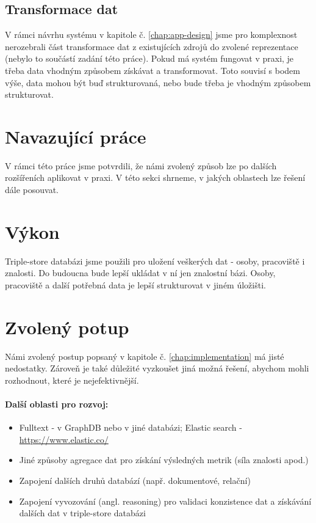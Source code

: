 \subsection{Transformace dat}
V rámci návrhu systému v kapitole č. \ref{chap:app-design} jsme pro komplexnost nerozebrali část transformace dat z existujících zdrojů do zvolené reprezentace (nebylo to součástí zadání této práce). Pokud má systém fungovat v praxi, je třeba data vhodným způsobem získávat a transformovat. Toto souvisí s bodem výše, data mohou být buď strukturovaná, nebo bude třeba je vhodným způsobem strukturovat.

\section{Navazující práce}
V rámci této práce jsme potvrdili, že námi zvolený způsob lze po dalších rozšířeních aplikovat v praxi. V této sekci shrneme, v jakých oblastech lze řešení dále posouvat.
\section{Výkon}
Triple-store databázi jsme použili pro uložení veškerých dat - osoby, pracoviště i znalosti. Do budoucna bude lepší ukládat v ní jen znalostní bázi. Osoby, pracoviště a další potřebná data je lepší strukturovat v jiném úložišti.\par
\section{Zvolený potup}
Námi zvolený postup popsaný v kapitole č. \ref{chap:implementation} má jisté nedostatky. Zároveň je také důležité vyzkoušet jiná možná řešení, abychom mohli rozhodnout, které je nejefektivnější.\par
\paragraph{Další oblasti pro rozvoj:}
\begin{itemize}
    \item Fulltext - v GraphDB nebo v jiné databázi; Elastic search - \url{https://www.elastic.co/}
    \item Jiné způsoby agregace dat pro získání výsledných metrik (síla znalosti apod.)
    \item Zapojení dalších druhů databází (např. dokumentové, relační)
    \item Zapojení vyvozování (angl. reasoning) pro validaci konzistence dat a získávání dalších dat v triple-store databázi
\end{itemize}


